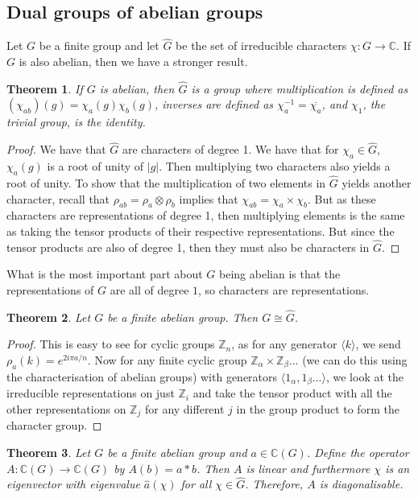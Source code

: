 \documentclass[]{article}
\newtheorem{theorem}{Theorem}
\theoremstyle{definition}
\numberwithin{theorem}{section}
\numberwithin{equation}{section}
\begin{document}
\subsection{Dual groups of abelian groups}
Let $G$ be a finite group and let $\widehat{G}$ be the set of irreducible characters $\chi: G \rightarrow \mathbb{C}$. If $G$ is also abelian, then we have a stronger result. 
\begin{theorem}
	If $G$ is abelian, then $\widehat{G}$ is a group where multiplication is defined as $(\chi_{ab})(g) = \chi_a(g)\chi_b(g)$, inverses are defined as $\chi_a^{-1} = \overline{\chi_a}$, and $\chi_1$, the trivial group, is the identity. 
\end{theorem}
\begin{proof}
	We have that $\widehat{G}$ are characters of degree 1.
	 We have that for $\chi_a \in \widehat{G}$, $\chi_a(g)$ is a root of unity of $|g|$. Then multiplying two characters also yields a root of unity. To show that the multiplication of two elements in $\widehat{G}$ yields another character, recall that $\rho_{ab} = \rho_a \otimes \rho_b$ implies that $\chi_{ab} = \chi_a \times \chi_b$. But as these characters are representations of degree 1, then multiplying elements is the same as taking the tensor products of their respective representations. But since the tensor products are also of degree 1, then they must also be characters in $\widehat{G}$. 
\end{proof}
What is the most important part about $G$ being abelian is that the representations of $G$ are all of degree $1$, so characters are representations. 
\begin{theorem}
	Let $G$ be a finite abelian group. Then $G \cong \widehat{G}$.
\end{theorem}
\begin{proof}
	This is easy to see for cyclic groups $\mathbb{Z}_n$, as for any generator $\langle k \rangle$, we send $\rho_a(k) = e^{2 i \pi a / n}$. Now for any finite cyclic group $\mathbb{Z}_{\alpha} \times \mathbb{Z}_{\beta}... $ (we can do this using the characterisation of abelian groups) with generators $\langle 1_{\alpha}, 1_\beta... \rangle$, we look at the irreducible representations on just $\mathbb{Z}_{i}$ and take the tensor product with all the other representations on $\mathbb{Z}_j$ for any different $j$ in the group product to form the character group. 
\end{proof}

\begin{theorem}
	\label{thm:Eigenvector operators}
	Let $G$ be a finite abelian group and $a \in \mathbb{C}(G)$. Define the operator $A: \mathbb{C}(G) \rightarrow \mathbb{C}(G)$ by $A(b) = a \ast b$. Then $A$ is linear and furthermore $\chi$ is an eigenvector with eigenvalue $\widehat{a}(\chi)$ for all $\chi \in \widehat{G}$. Therefore, $A$ is diagonalisable. 
\end{theorem}
\end{document}
